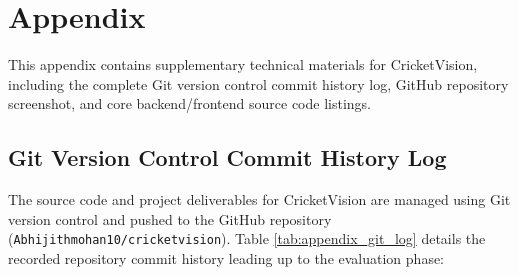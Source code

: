 \appendix
\chapter{Appendix}

This appendix contains supplementary technical materials for CricketVision, including the complete Git version control commit history log, GitHub repository screenshot, and core backend/frontend source code listings.

\section{Git Version Control Commit History Log}

The source code and project deliverables for CricketVision are managed using Git version control and pushed to the GitHub repository (\texttt{Abhijithmohan10/cricketvision}). Table \ref{tab:appendix_git_log} details the recorded repository commit history leading up to the evaluation phase:

